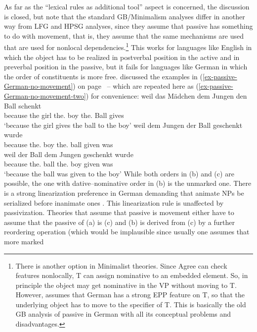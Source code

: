 As far as the ``lexical rules as additional tool'' aspect is concerned, the discussion is closed, but
note that the standard GB/Minimalism analyses differ in another way from LFG and HPSG analyses,
since they assume that passive has something to do with movement, that is, they assume that the same mechanisms
are used that are used for nonlocal dependencies.\footnote{
  There is another option in Minimalist theories. Since Agree can check features
  nonlocally, T can assign nominative to an embedded element. So, in principle the object may get
  nominative in the VP without moving to T. However, \citet[]{Adger2003a} assumes that German has a
  strong EPP feature on T, so that the underlying object has to move to the specifier of T. This is
  basically the old GB analysis of passive in German with all its conceptual problems and disadvantages.
}
This works for languages like English in which
the object has to be realized in postverbal position in the active and in preverbal position in the
passive, but it fails for languages like German in which the order of constituents is more free.
\citet[Section~4.4.3]{Lenerz77} discussed the examples in (\ref{ex-passive-German-no-movement}) on
page~\pageref{ex-passive-German-no-movement} -- which are repeated here as
(\ref{ex-passive-German-no-movement-two}) for convenience:
\eal
\label{ex-passive-German-no-movement-two}
\ex 
\gll weil das Mädchen dem Jungen den Ball schenkt\\
     because the girl the.\dat{} boy the.\acc{} Ball gives\\
\glt `because the girl gives the ball to the boy'
\ex 
\gll weil dem Jungen der Ball geschenkt wurde\\
     because the.\dat{} boy the.\nom{} ball given was\\
\ex 
\gll weil der Ball dem Jungen geschenkt wurde\\
     because the.\nom{} ball the.\dat{} boy given was\\
\glt `because the ball was given to the boy'
\zl
While both orders in (b) and (c) are possible, the one with dative--nominative order
in (b) is the unmarked one. There is a strong linearization preference in German demanding that
animate NPs be serialized before inanimate ones \citep[]{Hoberg81a}. This linearization rule is
unaffected by passivization. 
Theories that assume that passive is movement either have to
assume that the passive of (a) is (c) and (b) is derived from (c) by a
further reordering operation (which would be implausible since usually one assumes that more marked
